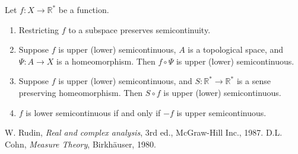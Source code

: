 \documentclass[12pt]{article}
\begin{document}
Let $f\colon X\to \mathbb{R}^*$ be a function.
\begin{enumerate}
\item Restricting $f$ to a subspace preserves semicontinuity.
\item Suppose $f$ is upper (lower) semicontinuous, $A$ is a topological space, and 
$\Psi\colon A\to X$ is a homeomorphism. Then $f\circ\Psi$ is upper (lower) semicontinuous. 
\item Suppose $f$ is upper (lower) semicontinuous, and 
$S\colon \mathbb{R}^*\to \mathbb{R}^*$ is a sense preserving homeomorphism. 
Then $S\circ f$ is upper (lower) semicontinuous. 
\item $f$ is lower semicontinuous if and only if 
$-f$ is upper semicontinuous.
\end{enumerate}

\begin{thebibliography}{9}
 W. Rudin, \emph{Real and complex analysis}, 3rd ed., McGraw-Hill Inc., 1987.
 D.L. Cohn, \emph{Measure Theory}, Birkh\"auser, 1980.
 \end{thebibliography}
\end{document}
